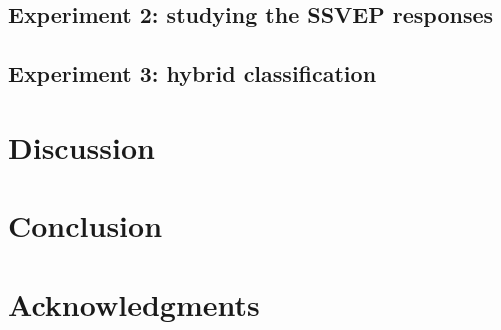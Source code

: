 \documentclass[10pt]{article}
\begin{document}
    \subsection{Experiment 2: studying the \acs{SSVEP} responses}
    \label{sec:3.2SSVEP}


    \subsection{Experiment 3: hybrid classification}
    \label{sec:3.3Hybrid}


\section{Discussion}
\label{sec:4Discuss}

\section{Conclusion}
\label{sec:6Conclusion}

\section*{Acknowledgments}

\printbibliography

%



\end{document}
